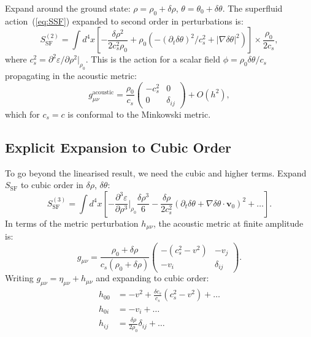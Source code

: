 \documentclass[11pt,a4paper]{article}
\theoremstyle{bctthm}
\theoremstyle{definition}
\begin{document}
Expand around the ground state: $\rho = \rho_0 + \delta\rho$,
$\theta = \theta_0 + \delta\theta$. The superfluid action~(\ref{eq:SSF})
expanded to second order in perturbations is:
\begin{equation}
S_\mathrm{SF}^{(2)} = \int d^4x\left[
-\frac{\delta\rho^2}{2c_s^2\rho_0}
+ \rho_0\left(-(\partial_t\delta\theta)^2/c_s^2
+ |\nabla\delta\theta|^2\right)\right]
\times\frac{\rho_0}{2c_s},
\label{eq:S2}
\end{equation}
where $c_s^2 = \partial^2\varepsilon/\partial\rho^2|_{\rho_0}$.
This is the action for a scalar field $\phi = \rho_0\delta\theta/c_s$ propagating
in the acoustic metric:
\begin{equation}
g_{\mu\nu}^\mathrm{acoustic} = \frac{\rho_0}{c_s}
\begin{pmatrix}
-c_s^2 & 0 \\ 0 & \delta_{ij}
\end{pmatrix}
+ O(h^2),
\label{eq:gac}
\end{equation}
which for $c_s = c$ is conformal to the Minkowski metric.

\subsection{Explicit Expansion to Cubic Order}

To go beyond the linearised result, we need the cubic and higher terms.
Expand $S_\mathrm{SF}$ to cubic order in $\delta\rho$, $\delta\theta$:
\begin{equation}
S_\mathrm{SF}^{(3)} = \int d^4x\left[
-\frac{\partial^3\varepsilon}{\partial\rho^3}\bigg|_{\rho_0}
\frac{\delta\rho^3}{6}
- \frac{\delta\rho}{2c_s^2}\left(\partial_t\delta\theta
+ \nabla\delta\theta\cdot\mathbf{v}_0\right)^2
+ \ldots\right].
\label{eq:S3}
\end{equation}
In terms of the metric perturbation $h_{\mu\nu}$, the acoustic metric at
finite amplitude is:
\begin{equation}
g_{\mu\nu} = \frac{\rho_0 + \delta\rho}{c_s(\rho_0+\delta\rho)}
\begin{pmatrix}
-(c_s^2-v^2) & -v_j \\ -v_i & \delta_{ij}
\end{pmatrix}.
\label{eq:gfull}
\end{equation}
Writing $g_{\mu\nu} = \eta_{\mu\nu} + h_{\mu\nu}$ and expanding to cubic order:
\begin{align}
h_{00} &= -v^2 + \frac{\delta c_s}{c_s}(c_s^2-v^2) + \ldots \\
h_{0i} &= -v_i + \ldots \\
h_{ij} &= \frac{\delta\rho}{2\rho_0}\delta_{ij} + \ldots
\label{eq:hmunu}
\end{align}
\end{document}
